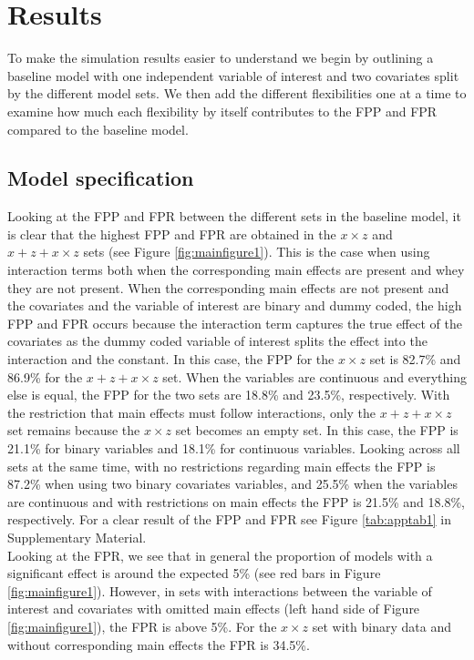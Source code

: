 \section{Results} 
To make the simulation results easier to understand we begin by outlining a baseline model with one independent  variable of interest and two covariates split by the different model sets. We then add the different flexibilities one at a time to examine how much each flexibility by itself contributes to the FPP and FPR compared to the baseline model. 

\subsection{Model specification}
Looking at the FPP and FPR between the different sets in the baseline model, it is clear that the highest FPP and FPR are obtained in the $x \times z$ and $x + z+ x \times z$ sets (see Figure \ref{fig:mainfigure1}). This is the case when using interaction terms both when the corresponding main effects are present and whey they are not present. When the corresponding main effects are not present and the covariates and the variable of interest are binary and dummy coded, the high FPP and FPR occurs because the interaction term  captures the true effect of the covariates as the dummy coded variable of interest splits the effect into the interaction and the constant. In this case, the FPP for the $x \times z$ set is 82.7\% and 86.9\% for the $x + z+ x \times z$ set. When the variables are continuous and everything else is equal, the FPP for the two sets are 18.8\% and 23.5\%, respectively. With the restriction that main effects must follow interactions, only the $x + z+ x \times z$ set remains because the $x \times z$ set becomes an empty set. In this case, the FPP is 21.1\% for binary variables and 18.1\% for continuous variables. Looking across all sets at the same time, with no restrictions regarding main effects the FPP is 87.2\% when using two binary covariates variables, and 25.5\% when the variables are continuous and with restrictions on main effects the FPP is 21.5\% and 18.8\%, respectively. For a clear result of the FPP and FPR see Figure \ref{tab:apptab1} in Supplementary Material.\\ 
Looking at the FPR, we see that in general the proportion of models with a significant effect is around the expected 5\%  (see red bars in Figure \ref{fig:mainfigure1}). However, in sets with interactions between the variable of interest and covariates with omitted main effects (left hand side of Figure \ref{fig:mainfigure1}), the FPR is above 5\%. For the $x \times z$ set with binary data and without corresponding main effects the FPR is 34.5\%.
 \\

